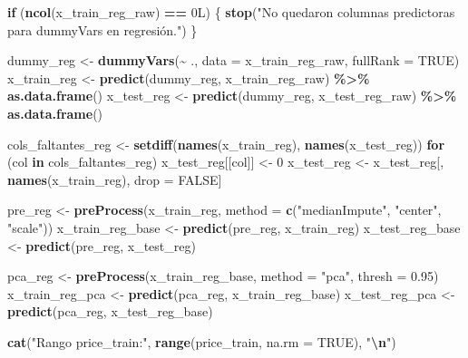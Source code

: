 \documentclass[
]{article}
\newenvironment{Shaded}{\begin{snugshade}}{\end{snugshade}}
\newcommand{\AttributeTok}[1]{\textcolor[rgb]{0.13,0.29,0.53}{#1}}
\newcommand{\ConstantTok}[1]{\textcolor[rgb]{0.56,0.35,0.01}{#1}}
\newcommand{\ControlFlowTok}[1]{\textcolor[rgb]{0.13,0.29,0.53}{\textbf{#1}}}
\newcommand{\DecValTok}[1]{\textcolor[rgb]{0.00,0.00,0.81}{#1}}
\newcommand{\FloatTok}[1]{\textcolor[rgb]{0.00,0.00,0.81}{#1}}
\newcommand{\FunctionTok}[1]{\textcolor[rgb]{0.13,0.29,0.53}{\textbf{#1}}}
\newcommand{\NormalTok}[1]{#1}
\newcommand{\OtherTok}[1]{\textcolor[rgb]{0.56,0.35,0.01}{#1}}
\newcommand{\SpecialCharTok}[1]{\textcolor[rgb]{0.81,0.36,0.00}{\textbf{#1}}}
\newcommand{\StringTok}[1]{\textcolor[rgb]{0.31,0.60,0.02}{#1}}
\begin{document}
\begin{Shaded}
\begin{Highlighting}[]
\ControlFlowTok{if}\NormalTok{ (}\FunctionTok{ncol}\NormalTok{(x\_train\_reg\_raw) }\SpecialCharTok{==}\NormalTok{ 0L) \{}
  \FunctionTok{stop}\NormalTok{(}\StringTok{"No quedaron columnas predictoras para dummyVars en regresión."}\NormalTok{)}
\NormalTok{\}}

\NormalTok{dummy\_reg }\OtherTok{\textless{}{-}} \FunctionTok{dummyVars}\NormalTok{(}\SpecialCharTok{\textasciitilde{}}\NormalTok{ ., }\AttributeTok{data =}\NormalTok{ x\_train\_reg\_raw, }\AttributeTok{fullRank =} \ConstantTok{TRUE}\NormalTok{)}
\NormalTok{x\_train\_reg }\OtherTok{\textless{}{-}} \FunctionTok{predict}\NormalTok{(dummy\_reg, x\_train\_reg\_raw) }\SpecialCharTok{\%\textgreater{}\%} \FunctionTok{as.data.frame}\NormalTok{()}
\NormalTok{x\_test\_reg  }\OtherTok{\textless{}{-}} \FunctionTok{predict}\NormalTok{(dummy\_reg, x\_test\_reg\_raw)  }\SpecialCharTok{\%\textgreater{}\%} \FunctionTok{as.data.frame}\NormalTok{()}

\NormalTok{cols\_faltantes\_reg }\OtherTok{\textless{}{-}} \FunctionTok{setdiff}\NormalTok{(}\FunctionTok{names}\NormalTok{(x\_train\_reg), }\FunctionTok{names}\NormalTok{(x\_test\_reg))}
\ControlFlowTok{for}\NormalTok{ (col }\ControlFlowTok{in}\NormalTok{ cols\_faltantes\_reg) x\_test\_reg[[col]] }\OtherTok{\textless{}{-}} \DecValTok{0}
\NormalTok{x\_test\_reg }\OtherTok{\textless{}{-}}\NormalTok{ x\_test\_reg[, }\FunctionTok{names}\NormalTok{(x\_train\_reg), drop }\OtherTok{=} \ConstantTok{FALSE}\NormalTok{]}

\NormalTok{pre\_reg }\OtherTok{\textless{}{-}} \FunctionTok{preProcess}\NormalTok{(x\_train\_reg, }\AttributeTok{method =} \FunctionTok{c}\NormalTok{(}\StringTok{"medianImpute"}\NormalTok{, }\StringTok{"center"}\NormalTok{, }\StringTok{"scale"}\NormalTok{))}
\NormalTok{x\_train\_reg\_base }\OtherTok{\textless{}{-}} \FunctionTok{predict}\NormalTok{(pre\_reg, x\_train\_reg)}
\NormalTok{x\_test\_reg\_base  }\OtherTok{\textless{}{-}} \FunctionTok{predict}\NormalTok{(pre\_reg, x\_test\_reg)}

\NormalTok{pca\_reg }\OtherTok{\textless{}{-}} \FunctionTok{preProcess}\NormalTok{(x\_train\_reg\_base, }\AttributeTok{method =} \StringTok{"pca"}\NormalTok{, }\AttributeTok{thresh =} \FloatTok{0.95}\NormalTok{)}
\NormalTok{x\_train\_reg\_pca }\OtherTok{\textless{}{-}} \FunctionTok{predict}\NormalTok{(pca\_reg, x\_train\_reg\_base)}
\NormalTok{x\_test\_reg\_pca  }\OtherTok{\textless{}{-}} \FunctionTok{predict}\NormalTok{(pca\_reg, x\_test\_reg\_base)}

\FunctionTok{cat}\NormalTok{(}\StringTok{"Rango price\_train:"}\NormalTok{, }\FunctionTok{range}\NormalTok{(price\_train, }\AttributeTok{na.rm =} \ConstantTok{TRUE}\NormalTok{), }\StringTok{"}\SpecialCharTok{\textbackslash{}n}\StringTok{"}\NormalTok{)}
\end{Highlighting}
\end{Shaded}
\end{document}
